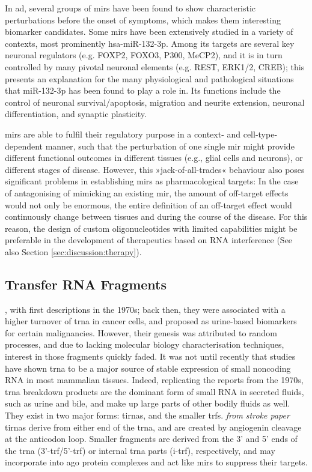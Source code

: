 In \ac{ad}, several groups of \acp{mir} have been found to show characteristic perturbations before the onset of symptoms, which makes them interesting biomarker candidates\cite{Salta2017a}. Some \acp{mir} have been extensively studied in a variety of contexts, most prominently hsa-miR-132-3p. Among its targets are several key neuronal regulators (e.g. FOXP2, FOXO3, P300, MeCP2), and it is in turn controlled by many pivotal neuronal elements (e.g. REST, ERK1/2, CREB); this presents an explanation for the many physiological and pathological situations that miR-132-3p has been found to play a role in. Its functions include the control of neuronal survival/apoptosis, migration and neurite extension, neuronal differentiation, and synaptic plasticity. 

\acp{mir} are able to fulfil their regulatory purpose in a context- and cell-type-dependent manner\cite{Lu2015}, such that the perturbation of one single \ac{mir} might provide different functional outcomes in different tissues (e.g., glial cells and neurons), or different stages of disease. However, this »jack-of-all-trades« behaviour also poses significant problems in establishing \acp{mir} as pharmacological targets: In the case of antagonising of mimicking an existing \ac{mir}, the amount of off-target effects would not only be enormous, the entire definition of an off-target effect would continuously change between tissues and during the course of the disease. For this reason, the design of custom oligonucleotides with limited capabilities might be preferable in the development of therapeutics based on RNA interference (See also Section \ref{sec:discussion:therapy}).

\subsection{Transfer RNA Fragments}
, with first descriptions in the 1970s; back then, they were associated with a higher turnover of \ac{trna} in cancer cells\cite{Borek1977}, and proposed as urine-based biomarkers for certain malignancies\cite{Speer1979}. However, their genesis was attributed to random processes, and due to lacking molecular biology characterisation techniques, interest in those fragments quickly faded. It was not until recently that studies have shown \ac{trna} to be a major source of stable expression of small noncoding RNA\cite{Cole2009,Lee2009} in most mammalian tissues. Indeed, replicating the reports from the 1970s, \ac{trna} breakdown products are the dominant form of small RNA in secreted fluids, such as urine and bile, and make up large parts of other bodily fluids as well\cite{Godoy2018}. They exist in two major forms: \acp{tirna}, and the smaller \acfp{trf}. \textit{from stroke paper} \acp{tirna} derive from either end of the \ac{trna}, and are created by angiogenin cleavage at the anticodon loop\cite{Yamasaki2009,Ivanov2011}. Smaller fragments are derived from the 3’ and 5’ ends of the \ac{trna} (3'-\ac{trf}/5'-\ac{trf}) or internal \ac{trna} parts (i-\ac{trf}), respectively, and may incorporate into \ac{ago} protein complexes and act like \acp{mir} to suppress their targets\cite{Burroughs2011,Kumar2014}.

